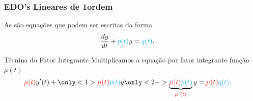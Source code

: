 \begin{frame}
\frametitle{EDO's Lineares de 1\fm ordem }

As  são equações que podem ser escritas da forma
\[\frac{dy}{dt}+{\color{cyan} p(t)}y={\color{cyan} q(t)}.\]

\begin{block}{Técnina do Fator Integrante}
Multiplicamos a equação por {\color{red} fator integrante} função {\color{red} $\mu(t)$ }
\[{\color{red} \mu(t)} y'(t)+\only<1>{{\color{red}\mu(t)} {\color{cyan} p(t)}y}\only<2->{\underbrace{{\color{red}\mu(t)} {\color{cyan} p(t)}}_{{\color{red} \mu'(t) }}y}={\color{red}\mu(t)}{\color{cyan}q(t)}.\]


\end{block}


 


\end{frame}



